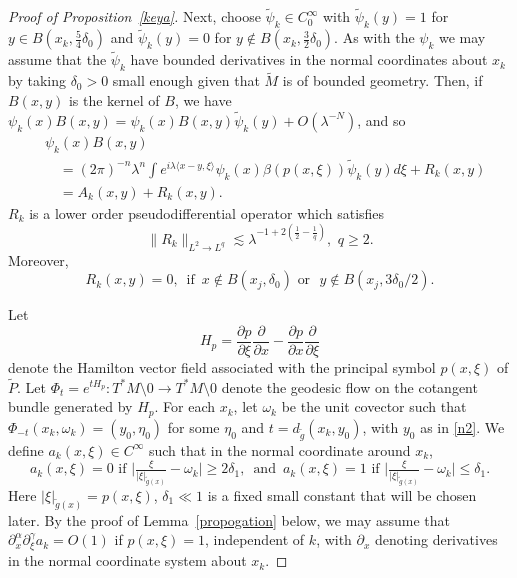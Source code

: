 \documentclass[10pt]{amsart}
\newcommand{\la}{\lambda}
\newcommand{\1}{{\bf 1}}
\begin{document}
\begin{proof}[Proof of Proposition~\ref{keya}]
Next, choose $\tilde \psi_k\in C^\infty_0$ with $\tilde \psi_k(y)=1$ for $y\in B(x_k, \tfrac54 \delta_0)$ and
$\tilde \psi_k(y)=0$ for $y\notin B(x_k,\tfrac32 \delta_0)$.  As with the $\psi_k$ we may assume that the $\tilde \psi_k$ have bounded derivatives
in the normal coordinates about $x_k$ by taking $\delta_0>0$ small enough given that $\tilde M$ is of bounded geometry.  Then, if $B(x,y)$ is the kernel of $B$, 
we have $\psi_k(x)B(x,y)=\psi_k(x)B(x,y)\tilde \psi_k(y)+O(\la^{-N})$, and so
%
\begin{equation}\label{n5}
\begin{aligned}
    &\psi_k(x)B(x,y)\\
    &\quad=(2\pi)^{-n}\la^n\int e^{i\la\langle x-y,\xi \rangle} \psi_k(x){\beta(p(x,\xi))}\tilde\psi_k(y)d\xi +R_k(x,y)\\
    &\quad= A_k(x,y)+R_k(x,y).
\end{aligned}
\end{equation}
$R_k$ is a lower order pseudodifferential operator which satisfies 
\begin{equation}\label{rk}
    \|R_k\|_{L^2\to L^q}\lesssim \la^{-1+2(\frac12-\frac1q)},\,\,q\ge 2.
\end{equation}
Moreover, 
$$ R_k(x,y)=0,\,\,\, \text{if } \, x\notin B(x_j,{\delta_0}) \, \,
\text{or } \, \, y\notin B(x_j,3{\delta_0}/2).
$$


{{
Let $$H_p=\frac{\partial p}{\partial \xi}\frac{\partial }{\partial x}-\frac{\partial p}{\partial x}\frac{\partial }{\partial \xi}$$ denote the Hamilton vector field associated with the principal symbol $p(x,\xi)$ of $\tilde P$.
Let $\Phi_t=e^{tH_p}: {T^*M\setminus 0\to T^*M\setminus 0}$ denote the geodesic flow on the cotangent bundle generated by $H_p$.
For each $x_k$, let $\omega_k$ be the unit covector such that $\Phi_{-t}(x_k, \omega_k)=(y_0, \eta_0)$ for some $\eta_0$ and $t=d_{\tilde g}(x_k, y_0)$,
with $y_0$ as in \eqref{n2}. 
We define $a_k(x,\xi)\in C^\infty$ such that in the normal coordinate around $x_k$,}}
\begin{equation}\label{n6}
a_{k}(x,\xi)=0 \, \, 
\text{if } 
\bigl|\tfrac{\xi}{|\xi|_{\tilde g(x)}}-\omega_k\bigr|\ge 2\delta_1,\,\,\,\text{and}\,\,\,a_{k}(x,\xi)=1 \, \, 
\text{if } 
\bigl|\tfrac{\xi}{|\xi|_{\tilde g(x)}}-\omega_k\bigr|\le \delta_1.
\end{equation}
Here $|\xi|_{\tilde g(x)}=p(x,\xi)$, $\delta_1\ll1$ is a fixed small constant that will be chosen later. 
By the proof of Lemma~\ref{propogation} below, we may assume that $\partial^\alpha_x \partial^\gamma_{\xi} a_k=O(1)$ if $p(x,\xi)=1$, independent of $k$, with $\partial_x$ denoting
derivatives in the normal coordinate system about $x_k$.



\end{proof}
\end{document}

